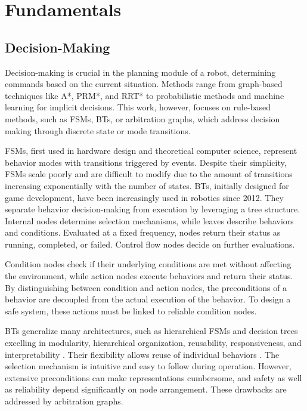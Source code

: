 
\section{Fundamentals}


\subsection{Decision-Making}

Decision-making is crucial in the planning module of a robot, determining commands based on the current situation.
Methods range from graph-based techniques like A*, PRM*, and RRT* to probabilistic methods and machine learning for implicit decisions.
This work, however, focuses on rule-based methods, such as \glspl{FSM}, \glspl{BT}, or arbitration graphs, which address decision making through discrete state or mode transitions.

\glspl{FSM}, first used in hardware design and theoretical computer science, represent behavior modes with transitions triggered by events.
Despite their simplicity, \glspl{FSM} scale poorly and are difficult to modify due to the amount of transitions increasing exponentially with the number of states.
\glspl{BT}, initially designed for game development, have been increasingly used in robotics since 2012.
They separate behavior decision-making from execution by leveraging a tree structure.
Internal nodes determine selection mechanisms, while leaves describe behaviors and conditions.
Evaluated at a fixed frequency, nodes return their status as running, completed, or failed.
Control flow nodes decide on further evaluations.

Condition nodes check if their underlying conditions are met without affecting the environment, while action nodes execute behaviors and return their status.
By distinguishing between condition and action nodes, the preconditions of a behavior  are decoupled from the actual execution of the behavior.
To design a safe system, these actions must be linked to reliable condition nodes.

\glspl{BT} generalize many architectures, such as hierarchical \glspl{FSM} and decision trees \cite{colledanchiseHowBehaviorTrees2017} excelling in modularity, hierarchical organization, reusability, responsiveness, and interpretability \cite{colledanchiseBehaviorTreesRobotics2018}.
Their flexibility allows reuse of individual behaviors \cite{bagnellIntegratedSystemAutonomous2012}.
The selection mechanism is intuitive and easy to follow during operation.
However, extensive preconditions can make representations cumbersome, and safety as well as reliability depend significantly on node arrangement.
These drawbacks are addressed by arbitration graphs.

